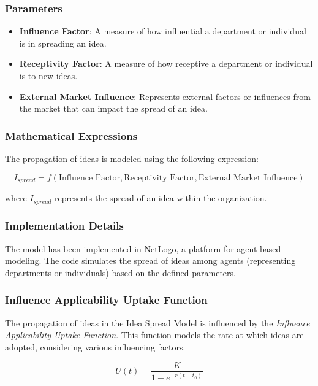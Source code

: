 \documentclass[sn-nature]{sn-jnl}%
\newcommand{\sbt}{\,\begin{picture}(-1,1)(-1,-3)\circle*{3}\end{picture}\ }
\theoremstyle{thmstyleone}%
\theoremstyle{thmstyletwo}%
\theoremstyle{thmstylethree}%
\begin{document}
\subsubsection{Parameters}
\begin{itemize}
    \item[\sbt] \textbf{Influence Factor}: A measure of how influential a department or individual is in spreading an idea.
    \item[\sbt] \textbf{Receptivity Factor}: A measure of how receptive a department or individual is to new ideas.
    \item[\sbt] \textbf{External Market Influence}: Represents external factors or influences from the market that can impact the spread of an idea.
\end{itemize}

\subsubsection{Mathematical Expressions}
The propagation of ideas is modeled using the following expression:

\begin{equation}
I_{spread} = f(\text{Influence Factor}, \text{Receptivity Factor}, \text{External Market Influence})
\end{equation}

where \( I_{spread} \) represents the spread of an idea within the organization.

\subsubsection{Implementation Details}
The model has been implemented in NetLogo, a platform for agent-based modeling. The code simulates the spread of ideas among agents (representing departments or individuals) based on the defined parameters.
\subsubsection{Influence Applicability Uptake Function}

The propagation of ideas in the Idea Spread Model is influenced by the \textit{Influence Applicability Uptake Function}\cite{rischling_influence_2023}. This function models the rate at which ideas are adopted, considering various influencing factors.

\begin{equation}
U(t) = \frac{K}{1 + e^{-r(t-t_0)}}
\end{equation}
\end{document}
